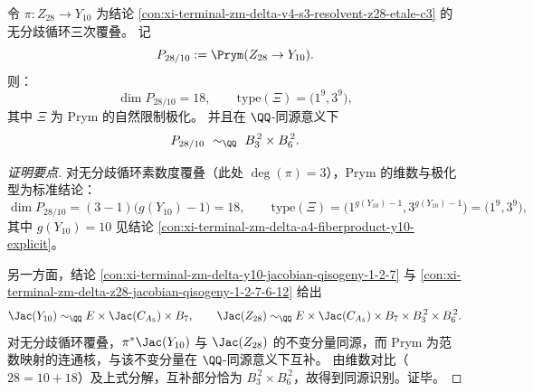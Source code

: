 \begin{conclusion}\label{con:xi-terminal-zm-delta-z28-y10-prym-polarization-type-b3-b6}
令 \(\pi:Z_{28}\to Y_{10}\) 为结论 \ref{con:xi-terminal-zm-delta-v4-s3-resolvent-z28-etale-c3} 的无分歧循环三次覆叠。
记
\[
P_{28/10}:=\Prym(Z_{28}\to Y_{10}).
\]
则：
\[
\dim P_{28/10}=18,
\qquad
\mathrm{type}(\Xi)=\bigl(1^{9},3^{9}\bigr),
\]
其中 \(\Xi\) 为 Prym 的自然限制极化。
并且在 \(\QQ\)-同源意义下
\[
P_{28/10}\ \sim_{\QQ}\ B_3^{\,2}\times B_6^{\,2}.
\]
\end{conclusion}
\begin{proof}[证明要点]
对无分歧循环素数度覆叠（此处 \(\deg(\pi)=3\)），Prym 的维数与极化型为标准结论：
\[
\dim P_{28/10}=(3-1)\bigl(g(Y_{10})-1\bigr)=18,
\qquad
\mathrm{type}(\Xi)=\bigl(1^{g(Y_{10})-1},3^{g(Y_{10})-1}\bigr)=\bigl(1^{9},3^{9}\bigr),
\]
其中 \(g(Y_{10})=10\) 见结论 \ref{con:xi-terminal-zm-delta-a4-fiberproduct-y10-explicit}。
\par
另一方面，结论 \ref{con:xi-terminal-zm-delta-y10-jacobian-qisogeny-1-2-7} 与 \ref{con:xi-terminal-zm-delta-z28-jacobian-qisogeny-1-2-7-6-12} 给出
\[
\Jac(Y_{10})\sim_{\QQ}E\times \Jac(C_{A_5})\times B_7,
\qquad
\Jac(Z_{28})\sim_{\QQ}E\times \Jac(C_{A_5})\times B_7\times B_3^{\,2}\times B_6^{\,2}.
\]
对无分歧循环覆叠，\(\pi^*\Jac(Y_{10})\) 与 \(\Jac(Z_{28})\) 的不变分量同源，而 Prym 为范数映射的连通核，与该不变分量在 \(\QQ\)-同源意义下互补。
由维数对比（\(28=10+18\)）及上式分解，互补部分恰为 \(B_3^{\,2}\times B_6^{\,2}\)，故得到同源识别。证毕。
\end{proof}

